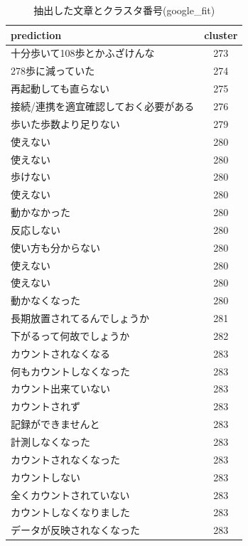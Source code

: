 \begin{table}[htbp]
  \caption{抽出した文章とクラスタ番号(google\_fit)}
  \label{tb:clustering}
  \begin{center}
  \begin{tabularx}{\linewidth}{|X|c|}
    \hline
    prediction&cluster\\\hline\hline
    十分歩いて108歩とかふざけんな&273\\\hline
    278歩に減っていた&274\\\hline
    再起動しても直らない&275\\\hline
    接続/連携を適宜確認しておく必要がある&276\\\hline
    歩いた歩数より足りない&279\\\hline
    使えない&280\\\hline
    使えない&280\\\hline
    歩けない&280\\\hline
    使えない&280\\\hline
    動かなかった&280\\\hline
    反応しない&280\\\hline
    使い方も分からない&280\\\hline
    使えない&280\\\hline
    使えない&280\\\hline
    動かなくなった&280\\\hline
    長期放置されてるんでしょうか&281\\\hline
    下がるって何故でしょうか&282\\\hline
    カウントされなくなる&283\\\hline
    何もカウントしなくなった&283\\\hline
    カウント出来ていない&283\\\hline
    カウントされず&283\\\hline
    記録ができませんと&283\\\hline
    計測しなくなった&283\\\hline
    カウントされなくなった&283\\\hline
    カウントしない&283\\\hline
    全くカウントされていない&283\\\hline
    カウントしなくなりました&283\\\hline
    データが反映されなくなった&283\\\hline
  \end{tabularx}\end{center}
\end{table}

